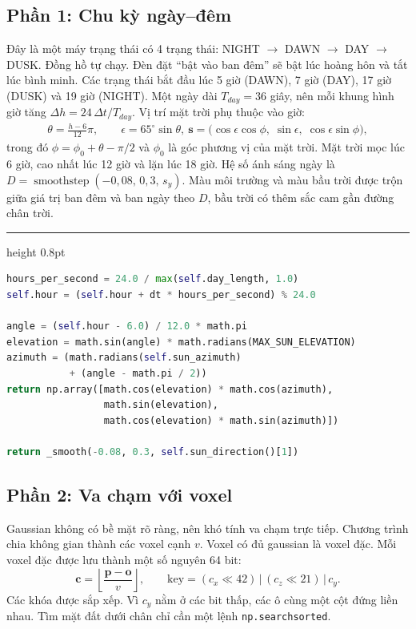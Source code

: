 \documentclass[9pt,twocolumn,a4paper]{extarticle}
\newenvironment{codebox}{\par\vspace{5pt}\noindent\begin{minipage}{\columnwidth}\hrule height 0.8pt\vspace{2pt}}{\end{minipage}\par\vspace{5pt}\noindent\ignorespaces}
\newcommand{\code}[1]{\texttt{#1}}
\begin{document}
\subsection{Phần 1: Chu kỳ ngày--đêm}
Đây là một máy trạng thái có 4 trạng thái: NIGHT $\to$ DAWN $\to$ DAY $\to$ DUSK. Đồng hồ tự chạy. Đèn đặt ``bật vào ban đêm'' sẽ bật lúc hoàng hôn và tắt lúc bình minh. Các trạng thái bắt đầu lúc 5 giờ (DAWN), 7 giờ (DAY), 17 giờ (DUSK) và 19 giờ (NIGHT). Một ngày dài $T_{day}=36$ giây, nên mỗi khung hình giờ tăng $\Delta h = 24\,\Delta t/T_{day}$. Vị trí mặt trời phụ thuộc vào giờ:
\begin{equation}
\begin{gathered}
\theta=\frac{h-6}{12}\pi,\qquad
\epsilon=65^{\circ}\sin\theta,\
\mathbf{s}=\big(\cos\epsilon\cos\phi,\;\sin\epsilon,\;\cos\epsilon\sin\phi\big),
\end{gathered}
\label{eq:sun}
\end{equation}
trong đó $\phi=\phi_0+\theta-\pi/2$ và $\phi_0$ là góc phương vị của mặt trời. Mặt trời mọc lúc 6 giờ, cao nhất lúc 12 giờ và lặn lúc 18 giờ. Hệ số ánh sáng ngày là $D=\operatorname{smoothstep}(-0{,}08,\,0{,}3,\,s_y)$. Màu môi trường và màu bầu trời được trộn giữa giá trị ban đêm và ban ngày theo $D$, bầu trời có thêm sắc cam gần đường chân trời.

\begin{codebox}
\begin{lstlisting}[language=Python,caption={\code{core/lighting.py}: giờ, hướng mặt trời và hệ số ánh sáng ngày},label={lst:sun}]
hours_per_second = 24.0 / max(self.day_length, 1.0)
self.hour = (self.hour + dt * hours_per_second) % 24.0

angle = (self.hour - 6.0) / 12.0 * math.pi
elevation = math.sin(angle) * math.radians(MAX_SUN_ELEVATION)
azimuth = (math.radians(self.sun_azimuth)
           + (angle - math.pi / 2))
return np.array([math.cos(elevation) * math.cos(azimuth),
                 math.sin(elevation),
                 math.cos(elevation) * math.sin(azimuth)])

return _smooth(-0.08, 0.3, self.sun_direction()[1])
\end{lstlisting}
\end{codebox}

\subsection{Phần 2: Va chạm với voxel}
Gaussian không có bề mặt rõ ràng, nên khó tính va chạm trực tiếp. Chương trình chia không gian thành các voxel cạnh $v$. Voxel có đủ gaussian là voxel đặc. Mỗi voxel đặc được lưu thành một số nguyên 64 bit:
\begin{equation}
\mathbf{c} = \left\lfloor \frac{\mathbf{p}-\mathbf{o}}{v} \right\rfloor,
\qquad
\text{key} = (c_x \ll 42)\,|\,(c_z \ll 21)\,|\,c_y.
\label{eq:voxel}
\end{equation}
Các khóa được sắp xếp. Vì $c_y$ nằm ở các bit thấp, các ô cùng một cột đứng liền nhau. Tìm mặt đất dưới chân chỉ cần một lệnh \code{np.searchsorted}.
\end{document}
